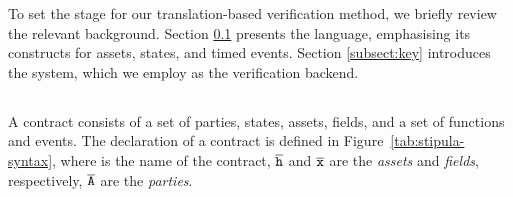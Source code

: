 
To set the stage for our translation-based verification method, we
briefly review the relevant background. Section \ref{subsect:stipula}
presents the {\Stipula} language, emphasising its constructs for
assets, states, and timed events.  Section \ref{subsect:key}
introduces the {\KeY} system, which we employ as the verification
backend.

\subsection{{\Stipula}}
\label{subsect:stipula}

A {\Stipula} contract consists of a set of parties, states, assets,
fields, and a set of functions and events. The declaration of a
contract is defined in Figure~\ref{tab:stipula-syntax}, where
 is the name of the contract, $\overline{\tt h}$ and
$\overline{\tt x}$ are the \emph{assets} and \emph{fields}, respectively,
$\overline{\tt A}$ are the \emph{parties}.
%
